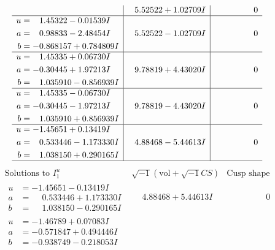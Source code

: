 \documentclass[1p]{elsarticle_modified}
\theoremstyle{definition}
\newcommand{\I}{\sqrt{-1}}
\begin{document}
$$\begin{array}{c|c|c}
 & \phantom{-}5.52522 + 1.02709 I & \phantom{-0.000000 } 0 \\ \hline\begin{aligned}
u &= \phantom{-}1.45322 - 0.01539 I \\
a &= \phantom{-}0.98833 - 2.48454 I \\
b &= -0.868157 + 0.784809 I\end{aligned}
 & \phantom{-}5.52522 - 1.02709 I & \phantom{-0.000000 } 0 \\ \hline\begin{aligned}
u &= \phantom{-}1.45335 + 0.06730 I \\
a &= -0.30445 + 1.97213 I \\
b &= \phantom{-}1.035910 - 0.856939 I\end{aligned}
 & \phantom{-}9.78819 + 4.43020 I & \phantom{-0.000000 } 0 \\ \hline\begin{aligned}
u &= \phantom{-}1.45335 - 0.06730 I \\
a &= -0.30445 - 1.97213 I \\
b &= \phantom{-}1.035910 + 0.856939 I\end{aligned}
 & \phantom{-}9.78819 - 4.43020 I & \phantom{-0.000000 } 0 \\ \hline\begin{aligned}
u &= -1.45651 + 0.13419 I \\
a &= \phantom{-}0.533446 - 1.173330 I \\
b &= \phantom{-}1.038150 + 0.290165 I\end{aligned}
 & \phantom{-}4.88468 - 5.44613 I & \phantom{-0.000000 } 0\\
 \hline 
 \end{array}$$\newpage$$\begin{array}{c|c|c}  
\text{Solutions to }I^u_{1}& \I (\text{vol} + \sqrt{-1}CS) & \text{Cusp shape}\\
 \hline 
\begin{aligned}
u &= -1.45651 - 0.13419 I \\
a &= \phantom{-}0.533446 + 1.173330 I \\
b &= \phantom{-}1.038150 - 0.290165 I\end{aligned}
 & \phantom{-}4.88468 + 5.44613 I & \phantom{-0.000000 } 0 \\ \hline\begin{aligned}
u &= -1.46789 + 0.07083 I \\
a &= -0.571847 + 0.494446 I \\
b &= -0.938749 - 0.218053 I\end{aligned}

\end{array}$$
\end{document}
